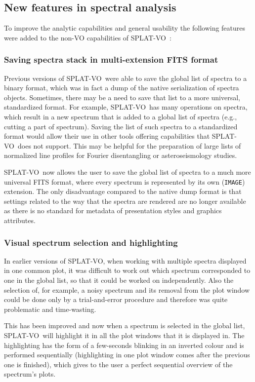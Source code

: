 \documentclass[final,authoryear,5p,times,twocolumn]{elsarticle}
\newcommand{\splatvo}{{\textsf{\small{SPLAT-VO}}}}
\begin{document}
\subsection{New features in spectral analysis}
%
\label{davids_functions} To improve the analytic capabilities and general
usability the following features were added to the non-VO capabilities of
\splatvo\ \citep{and146bcthesis}:

\subsubsection{Saving spectra stack in multi-extension FITS format}
%
Previous versions of \splatvo\ were able to save the global list of spectra to
a binary format, which was in fact a dump of the native serialization of
spectra objects. Sometimes, there may be a need to save that list to a more
universal, standardized format. For example, \splatvo\ has many operations on
spectra, which result in a new spectrum that is added to a global list of
spectra (e.g., cutting a part of spectrum). Saving the list of such spectra to
a standardized format would allow their use in other tools offering
capabilities that \splatvo\ does not support.  This may be helpful for the
preparation of large lists of normalized line profiles for Fourier
disentangling or asteroseismology studies.

\splatvo\ now allows the user to save the global list of spectra to a much more
universal FITS format, where every spectrum  is represented by its own
(\texttt{IMAGE}) extension.  The only disadvantage compared to the native dump
format is that settings related to the way that the spectra are rendered are no
longer available as there is no standard for metadata of presentation styles
and graphics attributes.

\subsubsection{Visual spectrum selection and highlighting}
%
In earlier versions of \splatvo, when working with multiple spectra displayed
in one common plot, it was difficult to work out which spectrum corresponded to
one in the global list, so that it could be worked on independently.  Also the
selection of, for example, a noisy spectrum and its removal from the plot
window could be done only by a trial-and-error procedure and therefore was
quite problematic and time-wasting.

This has been improved and now when a spectrum is selected in the global list,
\splatvo\ will highlight it in all the plot windows that it is displayed in.
The highlighting has the form of a few-seconds blinking in an inverted colour
and is performed sequentially (highlighting in one plot window comes after the
previous one is finished), which gives to the user a perfect sequential
overview of the spectrum's plots.
\end{document}
